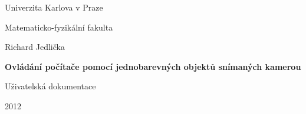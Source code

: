 \documentclass[12pt,a4paper]{article}
\let\openright=\clearpage
\begin{document}


\pagestyle{empty}
\begin{center}

\large

Univerzita Karlova v Praze

\medskip

Matematicko-fyzikální fakulta


\vfill

{\large Richard Jedlička}

\vspace{30mm}

{\LARGE\bfseries Ovládání počítače pomocí jednobarevných objektů snímaných kamerou}

\vfill

{\Huge Uživatelská dokumentace}

\vfill

2012

\end{center}

\newpage



\openright

\newpage


\openright
\pagestyle{plain}
\setcounter{page}{1}
\tableofcontents

\thispagestyle{empty}



\end{document}
